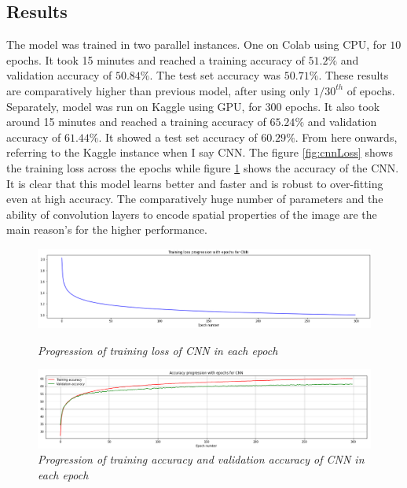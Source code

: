 \documentclass[10pt, a4paper, twocolumn]{article}
\begin{document}
\subsection{Results}
The model was trained in two parallel instances. One on Colab using CPU, for $10$ epochs. It took 15 minutes and reached a training accuracy of $51.2\%$ and validation accuracy of $50.84\%$. The test set accuracy was $50.71\%$. These results are comparatively higher than previous model, after using only $1/30^{th}$ of epochs.\\
Separately, model was run on Kaggle using GPU, for $300$ epochs. It also took around 15 minutes and reached a training accuracy of $65.24\%$ and validation accuracy of $61.44\%$. It showed a test set accuracy of $60.29\%$. From here onwards, referring to the Kaggle instance when I say CNN. The figure \ref{fig:cnnLoss} shows the training loss across the epochs while figure \ref{fig:cnnAcc} shows the accuracy of the CNN. It is clear that this model learns better and faster and is robust to over-fitting even at high accuracy. The comparatively huge number of parameters and the ability of convolution layers to encode spatial properties of the image are the main reason's for the higher performance.
\begin{figure}[H]
  \centering
	\includegraphics[width=.49\textwidth]{./images/cnnLoss.png}
	\caption{\textit{Progression of training loss of CNN in each epoch}}
	\label{fig:cnnLoss}
	\includegraphics[width=.49\textwidth]{./images/cnnAcc.png}
	\caption{\textit{Progression of training accuracy and validation accuracy of CNN in each epoch}}
	\label{fig:cnnAcc}
\end{figure}
\end{document}
